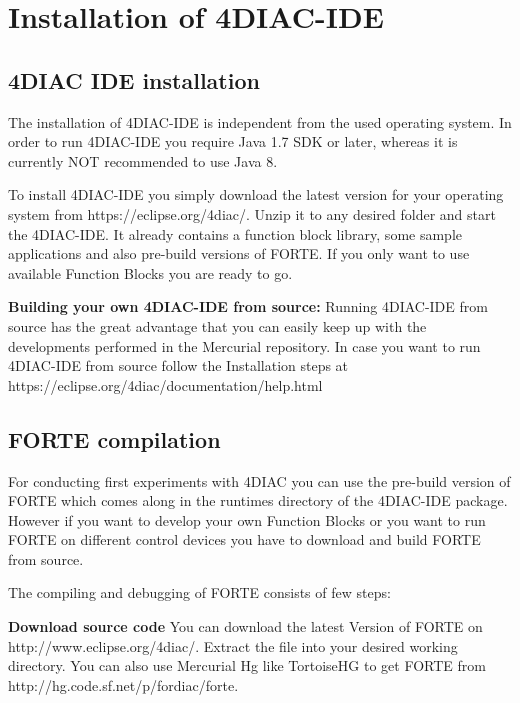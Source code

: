
\chapter{Installation of 4DIAC-IDE} %

\label{AppendixA} %

\section{4DIAC IDE installation}

The installation of 4DIAC-IDE is independent from the used operating system. In order to run 4DIAC-IDE you require Java 1.7 SDK or later, whereas it is currently NOT recommended to use Java 8.

To install 4DIAC-IDE you simply download the latest version for your operating system from https://eclipse.org/4diac/. Unzip it to any desired folder and start the 4DIAC-IDE. It already contains a function block library, some sample applications and also pre-build versions of FORTE. If you only want to use available Function Blocks you are ready to go.

\textbf{Building your own 4DIAC-IDE from source:} Running 4DIAC-IDE from source has the great advantage that you can easily keep up with the developments performed in the Mercurial repository. In case you want to run 4DIAC-IDE from source follow the Installation steps at https://eclipse.org/4diac/documentation/help.html

\section{FORTE compilation}

For conducting first experiments with 4DIAC you can use the pre-build version of FORTE which comes along in the runtimes directory of the 4DIAC-IDE package. However if you want to develop your own Function Blocks or you want to run FORTE on different control devices you have to download and build FORTE from source.

The compiling and debugging of FORTE consists of few steps:

\textbf{Download source code}
You can download the latest Version of FORTE on http://www.eclipse.org/4diac/. Extract the file into your desired working directory.
You can also use Mercurial Hg like TortoiseHG to get FORTE from http://hg.code.sf.net/p/fordiac/forte.


